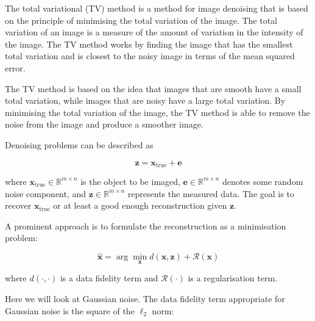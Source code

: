 \documentclass[12pt]{article}
\begin{document}
The total variational (TV) method is a method for image denoising that is based on the principle of minimising the total variation of the image.
The total variation of an image is a measure of the amount of variation in the intensity of the image.
The TV method works by finding the image that has the smallest total variation and is closest to the noisy image in terms of the mean squared error.

The TV method is based on the idea that images that are smooth have a small total variation, while images that are noisy have a large total variation.
By minimising the total variation of the image, the TV method is able to remove the noise from the image and produce a smoother image.


Denoising problems can be described as 

\begin{equation}
  \mathbf{z} = \mathbf{x}_{\text{true}} + \mathbf{e}
\end{equation}
  
where $\mathbf{x}_{\text{true}} \in \mathbb{R}^{m \times n}$ is 
the object to be imaged, 
$\mathbf{e} \in \mathbb{R}^{m \times n}$ denotes some random noise component, and $\mathbf{z} \in \mathbb{R}^{m \times n}$ represents 
the measured data.
The goal is to recover $\mathbf{x}_{\text{true}}$ or at least a good enough reconstruction given $\mathbf{z}$.

A prominent approach is to formulate the reconstruction as a minimisation problem:


\begin{equation}
  \hat{\mathbf{x}} = \arg \min_{\mathbf{x}} d(\mathbf{x}, \mathbf{z}) + \mathcal{R}(\mathbf{x})
\end{equation}

where $d(\cdot, \cdot)$ is a data fidelity term and $\mathcal{R}(\cdot)$ is a regularisation term.


Here we will look at Gaussian noise. The data fidelity term appropriate for Gaussian noise is the square of the $\ell_2$ norm:
\end{document}
